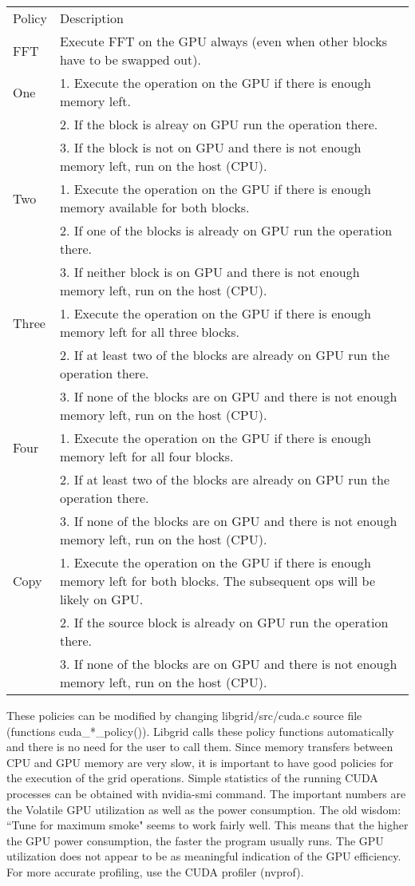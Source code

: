 \documentclass[12pt,letterpaper]{report}
\begin{document}
\begin{longtable}{p{} p{}}
Policy & Description\\
\cline{1-2}
FFT & Execute FFT on the GPU always (even when other blocks have to be swapped out).\\
One &  1. Execute the operation on the GPU if there is enough memory left.\\
    &  2. If the block is alreay on GPU run the operation there.\\
    &  3. If the block is not on GPU and there is not enough memory left, run on the host (CPU).\\
Two & 1. Execute the operation on the GPU if there is enough memory available for both blocks.\\
    & 2. If one of the blocks is already on GPU run the operation there.\\
    & 3. If neither block is on GPU and there is not enough memory left, run on the host (CPU).\\
Three & 1. Execute the operation on the GPU if there is enough memory left for all three blocks.\\
      & 2. If at least two of the blocks are already on GPU run the operation there.\\
      & 3. If none of the blocks are on GPU and there is not enough memory left, run on the host (CPU).\\
Four & 1. Execute the operation on the GPU if there is enough memory left for all four blocks.\\
     & 2. If at least two of the blocks are already on GPU run the operation there.\\     
     & 3. If none of the blocks are on GPU and there is not enough memory left, run on the host (CPU).\\
Copy & 1. Execute the operation on the GPU if there is enough memory left for both blocks. The subsequent ops will be likely on GPU.\\
     & 2. If the source block is already on GPU run the operation there.\\
     & 3. If none of the blocks are on GPU and there is not enough memory left, run on the host (CPU).\\
\end{longtable}
\noindent
These policies can be modified by changing libgrid/src/cuda.c source file (functions cuda\_*\_policy()). Libgrid calls these policy functions automatically and there is no need for the user to call them. Since memory transfers between CPU and GPU memory are very slow, it is important to have good policies for the execution of the grid operations. Simple statistics of the running CUDA processes can be obtained with nvidia-smi command. The important numbers are the Volatile GPU utilization as well as the power consumption. The old wisdom: ``Tune for maximum smoke" seems to work fairly well. This means that the higher the GPU power consumption, the faster the program usually runs. The GPU utilization does not appear to be as meaningful indication of the GPU efficiency. For more accurate profiling, use the CUDA profiler (nvprof).
\end{document}
